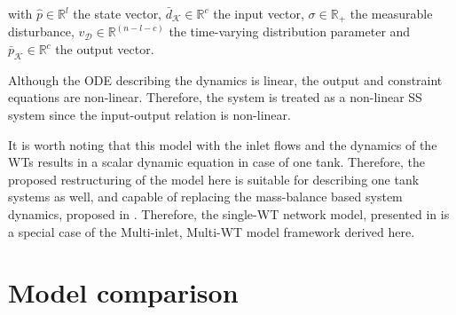 with $\hat{p} \in \mathbb{R}^{l}$ the state vector, $\bar{d}_{\mathcal{K}} \in \mathbb{R}^{c}$ the input vector, $\sigma \in \mathbb{R}_{+}$ the measurable disturbance, $v_{\mathcal{D}} \in \mathbb{R}^{(n-l-c)}$ the time-varying distribution parameter and $\bar{p}_{\mathcal{K}} \in \mathbb{R}^{c}$ the output vector. 

Although the ODE describing the dynamics is linear, the output and constraint equations are non-linear. Therefore, the system is treated as a non-linear SS system since the input-output relation is non-linear.  

It is worth noting that this model with the inlet flows and the dynamics of the WTs results in a scalar dynamic equation in case of one tank. Therefore, the proposed restructuring of the model here is suitable for describing one tank systems as well, and capable of replacing the mass-balance based system dynamics, proposed in . Therefore, the single-WT network model, presented in  is a special case of the Multi-inlet, Multi-WT model framework derived here. 




\newpage

\section{Model comparison}
\label{model_comparison}

